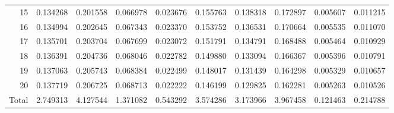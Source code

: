 \documentclass[lettersize,journal]{IEEEtran}
\begin{document}
\begin{table}[ht!]
\begin{center}
\begin{tabular}{r|l|l|l|l|l|l|l|l|l}
      15             & 0.134268                              & 0.201558           & 0.066978                                & 0.023676                             & 0.155763           & 0.138318           & 0.172897           & 0.005607          & 0.011215      \\
      16             & 0.134994                              & 0.202645           & 0.067343                                & 0.023370                             & 0.153752           & 0.136531           & 0.170664           & 0.005535          & 0.011070      \\
      17             & 0.135701                              & 0.203704           & 0.067699                                & 0.023072                             & 0.151791           & 0.134791           & 0.168488           & 0.005464          & 0.010929      \\
      18             & 0.136391                              & 0.204736           & 0.068046                                & 0.022782                             & 0.149880           & 0.133094           & 0.166367           & 0.005396          & 0.010791      \\
      19             & 0.137063                              & 0.205743           & 0.068384                                & 0.022499                             & 0.148017           & 0.131439           & 0.164298           & 0.005329          & 0.010657      \\
      20             & 0.137719                              & 0.206725           & 0.068713                                & 0.022222                             & 0.146199           & 0.129825           & 0.162281           & 0.005263          & 0.010526      \\
      Total          & 2.749313                              & 4.127544           & 1.371082                                & 0.543292                             & 3.574286           & 3.173966           & 3.967458           & 0.121463          & 0.214788      \\
    \end{tabular}
  \end{center}
\end{table}
\end{document}
